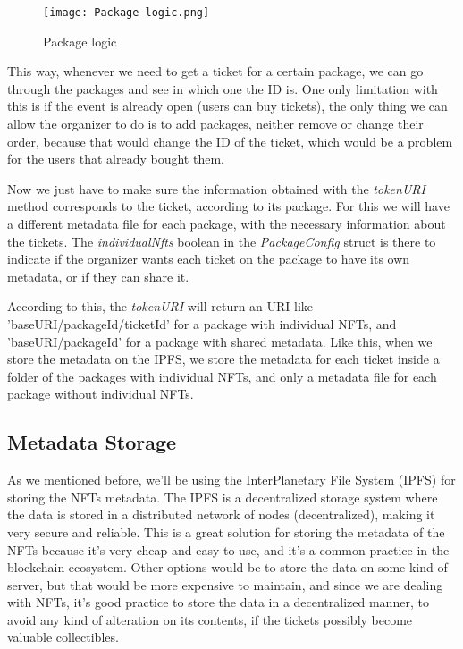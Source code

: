\begin{figure}[H]
	\texttt{[image: Package logic.png]}
	\centering
	\caption{Package logic}
	\label{fig:package_logic}
\end{figure}

This way, whenever we need to get a ticket for a certain package, we can go
through the packages and see in which one the ID is. One only limitation with
this is if the event is already open (users can buy tickets), the only thing we
can allow the organizer to do is to add packages, neither remove or change
their order, because that would change the ID of the ticket, which would be a
problem for the users that already bought them.

Now we just have to make sure the information obtained with the
\textit{tokenURI} method corresponds to the ticket, according to its package.
For this we will have a different metadata file for each package, with the
necessary information about the tickets. The \textit{individualNfts} boolean in
the \textit{PackageConfig} struct is there to indicate if the organizer wants
each ticket on the package to have its own metadata, or if they can share it.

According to this, the \textit{tokenURI} will return an URI like
'baseURI/packageId/ticketId' for a package with individual NFTs, and
'baseURI/packageId' for a package with shared metadata. Like this, when we
store the metadata on the IPFS, we store the metadata for each ticket inside a
folder of the packages with individual NFTs, and only a metadata file for each
package without individual NFTs.

\subsection{Metadata Storage}
\label{subsec:metadata_storage}

As we mentioned before, we'll be using the InterPlanetary File System (IPFS)
for storing the NFTs metadata. The IPFS is a decentralized storage system where
the data is stored in a distributed network of nodes (decentralized), making it
very secure and reliable. This is a great solution for storing the metadata of
the NFTs because it's very cheap and easy to use, and it's a common practice in
the blockchain ecosystem. Other options would be to store the data on some kind
of server, but that would be more expensive to maintain, and since we are
dealing with NFTs, it's good practice to store the data in a decentralized
manner, to avoid any kind of alteration on its contents, if the tickets
possibly become valuable collectibles.

